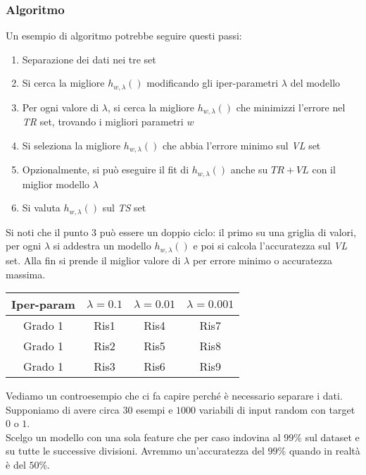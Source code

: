 \subsubsection{Algoritmo}
Un esempio di algoritmo potrebbe seguire questi passi:
\begin{enumerate}
	\item Separazione dei dati nei tre set
	\item Si cerca la migliore $h_{w,\lambda}()$ modificando gli iper-parametri $\lambda$ del modello
	\item Per ogni valore di $\lambda$, si cerca la migliore $h_{w,\lambda}()$ che minimizzi l'errore nel \textit{TR} set, trovando i migliori parametri $w$
	\item Si seleziona la migliore $h_{w,\lambda}()$ che abbia l'errore minimo sul \textit{VL} set
	\item Opzionalmente, si può eseguire il fit di $h_{w,\lambda}()$ anche su $TR+VL$ con il miglior modello $\lambda$ 
	\item Si valuta $h_{w,\lambda}()$ sul \textit{TS} set
\end{enumerate}
Si noti che il punto 3 può essere un doppio ciclo: il primo su una griglia di valori,  per ogni $\lambda$ si addestra un modello $h_{w,\lambda}()$ e poi si calcola l'accuratezza sul \textit{VL} set. Alla fin si prende il miglior valore di $\lambda$ per errore minimo o accuratezza massima.
\begin{table}[H]
	\centering
	\begin{tabular}{|c|c|c|c|}
		\hline
		\textbf{Iper-param} & $\lambda=0.1$ & $\lambda=0.01$ & $\lambda=0.001$ \\
		\hline
		Grado 1 & Ris1 & Ris4 & Ris7 \\
		\hline
		Grado 1 & Ris2& Ris5 & Ris8 \\
		\hline
		Grado 1 & Ris3 & Ris6 & Ris9 \\
		\hline
	\end{tabular}
\end{table}

\begin{example}[Controesempio]
	Vediamo un controesempio che ci fa capire perché è necessario separare i dati. Supponiamo di avere circa $30$ esempi e $1000$ variabili di input random con target $0$ o $1$.\\
	Scelgo un modello con una sola feature che per caso indovina al $99\%$ sul dataset e su tutte le successive divisioni. Avremmo un'accuratezza del $99\%$ quando in realtà è del $50\%$.
\end{example}

